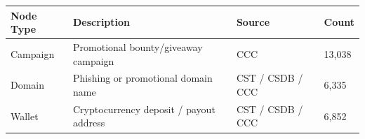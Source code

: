 \begin{tabular}{llll}
\toprule
Node Type & Description & Source & Count \\
\midrule
Campaign & Promotional bounty/giveaway campaign & CCC & 13,038 \\
Domain & Phishing or promotional domain name & CST / CSDB / CCC & 6,335 \\
Wallet & Cryptocurrency deposit / payout address & CST / CSDB / CCC & 6,852 \\
\bottomrule
\end{tabular}
